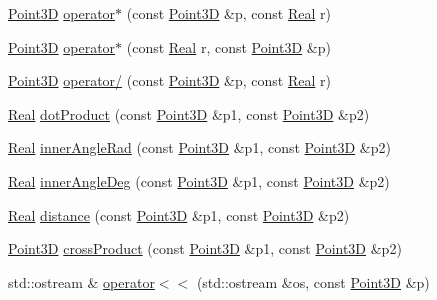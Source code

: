 \begin{DoxyCompactItemize}
\item 
\hyperlink{classFVCode3D_1_1Point3D}{Point3D} \hyperlink{namespaceFVCode3D_ac5c448428b01ffde71c0a70f80edb264}{operator$\ast$} (const \hyperlink{classFVCode3D_1_1Point3D}{Point3D} \&p, const \hyperlink{namespaceFVCode3D_a40c1f5588a248569d80aa5f867080e83}{Real} r)
\item 
\hyperlink{classFVCode3D_1_1Point3D}{Point3D} \hyperlink{namespaceFVCode3D_a3d65ba1de4aa9fa136a484cc1a331f62}{operator$\ast$} (const \hyperlink{namespaceFVCode3D_a40c1f5588a248569d80aa5f867080e83}{Real} r, const \hyperlink{classFVCode3D_1_1Point3D}{Point3D} \&p)
\item 
\hyperlink{classFVCode3D_1_1Point3D}{Point3D} \hyperlink{namespaceFVCode3D_a7e00e4f7126ac965092b3e79d66396d1}{operator/} (const \hyperlink{classFVCode3D_1_1Point3D}{Point3D} \&p, const \hyperlink{namespaceFVCode3D_a40c1f5588a248569d80aa5f867080e83}{Real} r)
\item 
\hyperlink{namespaceFVCode3D_a40c1f5588a248569d80aa5f867080e83}{Real} \hyperlink{namespaceFVCode3D_ad07be7f9ed843ca65d02d0303dae6cb4}{dot\+Product} (const \hyperlink{classFVCode3D_1_1Point3D}{Point3D} \&p1, const \hyperlink{classFVCode3D_1_1Point3D}{Point3D} \&p2)
\item 
\hyperlink{namespaceFVCode3D_a40c1f5588a248569d80aa5f867080e83}{Real} \hyperlink{namespaceFVCode3D_acbd112899b9e007bec3fe01223140c45}{inner\+Angle\+Rad} (const \hyperlink{classFVCode3D_1_1Point3D}{Point3D} \&p1, const \hyperlink{classFVCode3D_1_1Point3D}{Point3D} \&p2)
\item 
\hyperlink{namespaceFVCode3D_a40c1f5588a248569d80aa5f867080e83}{Real} \hyperlink{namespaceFVCode3D_ae33e5908d62b0ae8dbfdf089ab9bc138}{inner\+Angle\+Deg} (const \hyperlink{classFVCode3D_1_1Point3D}{Point3D} \&p1, const \hyperlink{classFVCode3D_1_1Point3D}{Point3D} \&p2)
\item 
\hyperlink{namespaceFVCode3D_a40c1f5588a248569d80aa5f867080e83}{Real} \hyperlink{namespaceFVCode3D_a705717c0673e24ca607c7a65054de4f7}{distance} (const \hyperlink{classFVCode3D_1_1Point3D}{Point3D} \&p1, const \hyperlink{classFVCode3D_1_1Point3D}{Point3D} \&p2)
\item 
\hyperlink{classFVCode3D_1_1Point3D}{Point3D} \hyperlink{namespaceFVCode3D_a1ee7c9a5fcc645574f6a93e5f6f53b4b}{cross\+Product} (const \hyperlink{classFVCode3D_1_1Point3D}{Point3D} \&p1, const \hyperlink{classFVCode3D_1_1Point3D}{Point3D} \&p2)
\item 
std\+::ostream \& \hyperlink{namespaceFVCode3D_a8884bc6475f7b278d2926ce82950a597}{operator$<$$<$} (std\+::ostream \&os, const \hyperlink{classFVCode3D_1_1Point3D}{Point3D} \&p)

\end{DoxyCompactItemize}
